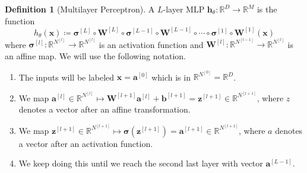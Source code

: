\documentclass{article}
\theoremstyle{definition}
\theoremstyle{remark}
\theoremstyle{definition}
\newtheorem{definition}{Definition}[section]
\begin{document}
\begin{definition}[Multilayer Perceptron]
A $L$-layer MLP $\mathbf{h}_\theta : \mathbb{R}^D \longrightarrow \mathbb{R}^M$ is the function 
\[h_\theta (\mathbf{x}) \coloneqq \boldsymbol{\sigma}^{[L]} \circ \mathbf{W}^{[L]} \circ \boldsymbol{\sigma}^{[L-1]} \circ \mathbf{W}^{[L-1]} \circ \cdots \circ \boldsymbol{\sigma}^{[1]} \circ \mathbf{W}^{[1]} (\mathbf{x})\]
where $\boldsymbol{\sigma}^{[l]}: \mathbb{R}^{N^{[l]}} \rightarrow \mathbb{R}^{N^{[l]}}$ is an activation function and $\mathbf{W}^{[l]}: \mathbb{R}^{N^{[l-1]}} \rightarrow \mathbb{R}^{N^{[l]}}$ is an affine map. We will use the following notation. 
\begin{enumerate}
    \item The inputs will be labeled $\mathbf{x} = \mathbf{a}^{[0]}$ which is in $\mathbb{R}^{N^{[0]}} = \mathbb{R}^D$. 
    
    \item We map $\mathbf{a}^{[l]} \in \mathbb{R}^{N^{[l]}} \mapsto \mathbf{W}^{[l+1]} \mathbf{a}^{[l]} + \mathbf{b}^{[l+1]}= \mathbf{z}^{[l+1]} \in \mathbb{R}^{N^{[l+1]}}$, where $z$ denotes a vector after an affine transformation. 

    \item We map $\mathbf{z}^{[l+1]} \in \mathbb{R}^{N^{[l+1]}} \mapsto \boldsymbol{\sigma}(\mathbf{z}^{[l+1]}) = \mathbf{a}^{[l+1]} \in \mathbb{R}^{N^{[l+1]}}$, where $a$ denotes a vector after an activation function. 

    \item We keep doing this until we reach the second last layer with vector $\mathbf{a}^{[L-1]}$. 


\end{enumerate}
\end{definition}
\end{document}
